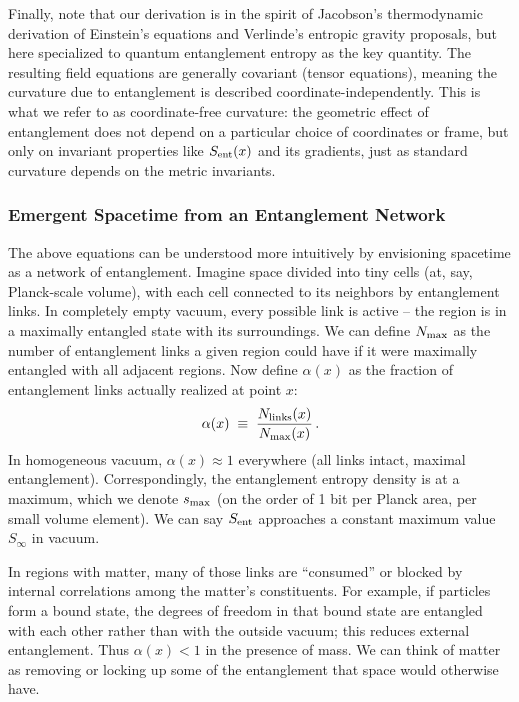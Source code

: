 \documentclass[11pt]{article}
\begin{document}
Finally, note that our derivation is in the spirit of Jacobson’s thermodynamic derivation of Einstein’s equations and Verlinde’s entropic gravity proposals​, but here specialized to quantum entanglement entropy as the key quantity. The resulting field equations are generally covariant (tensor equations), meaning the curvature due to entanglement is described coordinate-independently. This is what we refer to as coordinate-free curvature: the geometric effect of entanglement does not depend on a particular choice of coordinates or frame, but only on invariant properties like $S_{\rm ent}(x)$ and its gradients, just as standard curvature depends on the metric invariants.

\subsubsection{Emergent Spacetime from an Entanglement Network}

The above equations can be understood more intuitively by envisioning spacetime as a network of entanglement. Imagine space divided into tiny cells (at, say, Planck-scale volume), with each cell connected to its neighbors by entanglement links. In completely empty vacuum, every possible link is active – the region is in a maximally entangled state with its surroundings. We can define $N_{\rm max}$ as the number of entanglement links a given region could have if it were maximally entangled with all adjacent regions. Now define $\alpha(x)$ as the fraction of entanglement links actually realized at point $x$:
\begin{equation*}
\alpha(x) \;\equiv\; \frac{N_{\rm links}(x)}{N_{\rm max}(x)}\,. 
\end{equation*}
In homogeneous vacuum, $\alpha(x) \approx 1$ everywhere (all links intact, maximal entanglement). Correspondingly, the entanglement entropy density is at a maximum, which we denote $s_{\rm max}$ (on the order of 1 bit per Planck area, per small volume element​). We can say $S_{\rm ent}$ approaches a constant maximum value $S_{\infty}$ in vacuum.

In regions with matter, many of those links are “consumed” or blocked by internal correlations among the matter’s constituents. For example, if particles form a bound state, the degrees of freedom in that bound state are entangled with each other rather than with the outside vacuum; this reduces external entanglement. Thus $\alpha(x) < 1$ in the presence of mass. We can think of matter as removing or locking up some of the entanglement that space would otherwise have.
\end{document}
